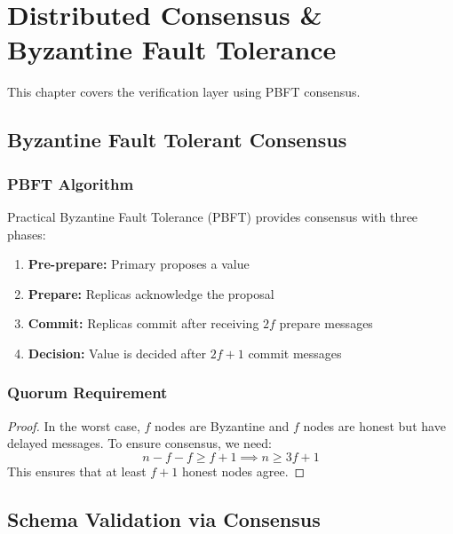 \chapter{Distributed Consensus \& Byzantine Fault Tolerance}

This chapter covers the verification layer using PBFT consensus.

\section{Byzantine Fault Tolerant Consensus}

\subsection{PBFT Algorithm}

Practical Byzantine Fault Tolerance (PBFT) \cite{castro1999practical} provides consensus with three phases:

\begin{enumerate}
    \item \textbf{Pre-prepare:} Primary proposes a value
    \item \textbf{Prepare:} Replicas acknowledge the proposal
    \item \textbf{Commit:} Replicas commit after receiving \(2f\) prepare messages
    \item \textbf{Decision:} Value is decided after \(2f+1\) commit messages
\end{enumerate}

\subsection{Quorum Requirement}

\begin{theorem}[3f+1 Nodes]}
    PBFT tolerates \(f\) Byzantine nodes with \(n = 3f + 1\) total nodes.
\end{theorem}

\begin{proof}
    In the worst case, \(f\) nodes are Byzantine and \(f\) nodes are honest but have delayed messages. To ensure consensus, we need:
    \begin{equation}
        n - f - f \geq f + 1 \implies n \geq 3f + 1
    \end{equation}
    This ensures that at least \(f + 1\) honest nodes agree.
\end{proof}

\section{Schema Validation via Consensus}


